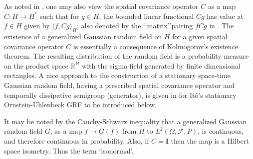 \documentclass[11pt]{article}
\numberwithin{equation}{section}
\theoremstyle{definition}
\theoremstyle{remark}
\theoremstyle{definition}
\begin{document}
 \begin{remark}
 As noted in \cite{Farisito}, one may also view the spatial
 covariance operator $C$ as a map $C:H\to H^*$ such
 that for $g\in H$, the bounded linear functional $Cg$
 has value at $f\in H$ given by $\langle f,Cg\rangle_H$;
 also denoted by the \lq\lq matrix\rq\rq pairing $fCg$
 in \cite{Farisito}.  The existence of a generalized 
 Gaussian random field on $H$ for a given 
 spatial covariance operator  $C$ is essentially a
 consequence of Kolmogorov's existence theorem. 
 The resulting distribution of the random field is a probability measure
 on the product space $\mathbb{R}^{H}$ with the
 sigma-field generated by finite dimensional rectangles.
 A nice approach to the construction of a stationary
 space-time Gaussian random field, having a prescribed
 spatial covariance operator and temporally dissipative semigroup (generator),
  is given in
 \cite{Farisito} for It\^o's stationary Ornstein-Uhlenbeck GRF
to be introduced below.
 \end{remark}
It may be noted by the Cauchy-Schwarz inequality that a generalized Gaussian random
field $G$, as a map $f\to G(f)$ from $H$ to
$L^2(\Omega,{\mathcal F},P)$, is continuous, and therefore
continuous  in probability. Also, if $C={\mathbf I}$ then the map
is a Hilbert space isometry. Thus the term `isonormal'. 
\end{document}
